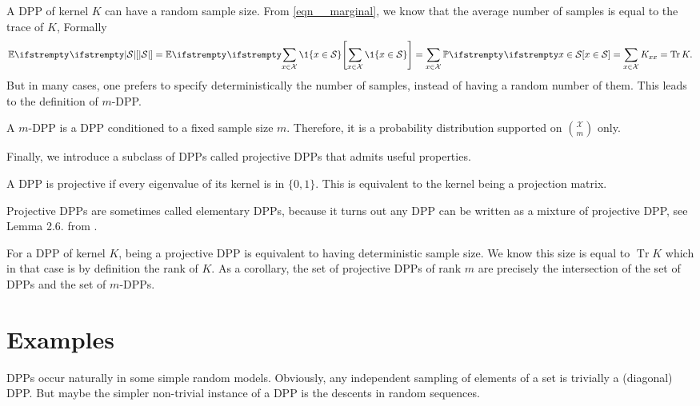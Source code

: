 A DPP of kernel $K$ can have a random sample size. From \cref{eqn__marginal}, we know that the average number of samples is equal to the trace of $K$, Formally
\begin{equation*}
    \EE{}{|\mathcal{S}|} = \EE{}{\sum_{x \in \mathcal{X}} \1\{x \in \mathcal{S}\}} = \sum_{x \in \mathcal{X}} \PP{}{x \in \mathcal{\mathcal{S}}} = \sum_{x \in \mathcal{X}}K_{xx}=  \operatorname{Tr}K.
\end{equation*} 
But in many cases, one prefers to specify deterministically the number of samples, instead of having a random number of them. This leads to the definition of $m$-DPP.
\begin{tcolorbox}
    \begin{definition}[$m$-DPP]
        A $m$-DPP is a DPP conditioned to a fixed sample size $m$. Therefore, it is a probability distribution supported on $\binom{\mathcal{X}}{m}$ only.
    \end{definition}
\end{tcolorbox}


Finally, we introduce a subclass of DPPs called projective DPPs that admits useful properties.

\begin{tcolorbox}
    \begin{definition}
        A DPP is projective if every eigenvalue of its kernel is in $\{0,1\}$. This is equivalent to the kernel being a projection matrix.
    \end{definition}
\end{tcolorbox}

Projective DPPs are sometimes called elementary DPPs, because it turns out any DPP can be written as a mixture of projective DPP, see Lemma 2.6. from \cite{kulesza2012_dpp_for_ml}. 

For a DPP of kernel $K$, being a projective DPP is equivalent to having deterministic sample size. We know this size is equal to $\operatorname{Tr}K$ which in that case is by definition the rank of $K$. As a corollary, the set of projective DPPs of rank $m$ are precisely the intersection of the set of DPPs and the set of $m$-DPPs.  


\section{Examples}

DPPs occur naturally in some simple random models. Obviously, any independent sampling of elements of a set is trivially a (diagonal) DPP. But maybe the simpler non-trivial instance of a DPP is the descents in random sequences.


